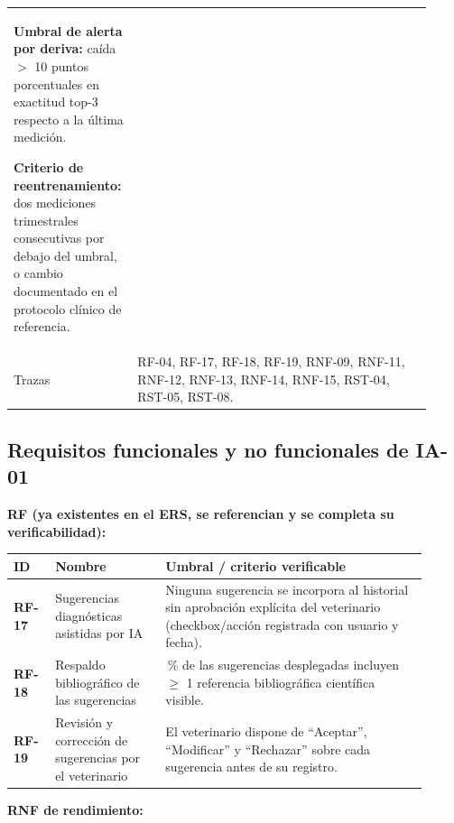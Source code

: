 \begin{longtable}{@{}>{\bfseries\raggedright\arraybackslash}p{0.24\linewidth} >{\raggedright\arraybackslash}p{0.68\linewidth}@{}}
\textbf{Umbral de alerta por deriva:} caída $>$ 10 puntos porcentuales en exactitud top-3 respecto a la última medición.

\textbf{Criterio de reentrenamiento:} dos mediciones trimestrales consecutivas por debajo del umbral, o cambio documentado en el protocolo clínico de referencia. \\[4pt]

Trazas & RF-04, RF-17, RF-18, RF-19, RNF-09, RNF-11, RNF-12, RNF-13, RNF-14, RNF-15, RST-04, RST-05, RST-08. \\

\end{longtable}

\subsection{Requisitos funcionales y no funcionales de IA-01}
\label{sec:rfrnf-ia01}

\textbf{RF (ya existentes en el ERS, se referencian y se completa su verificabilidad):}

\begin{longtable}{@{}>{\bfseries}p{0.09\linewidth} >{\raggedright\arraybackslash}p{0.24\linewidth} >{\raggedright\arraybackslash}p{0.58\linewidth}@{}}
\toprule
\textbf{ID} & \textbf{Nombre} & \textbf{Umbral / criterio verificable} \\
\midrule
\endhead
\bottomrule
\endlastfoot
RF-17 & Sugerencias diagnósticas asistidas por IA & Ninguna sugerencia se incorpora al historial sin aprobación explícita del veterinario (checkbox/acción registrada con usuario y fecha). \\
RF-18 & Respaldo bibliográfico de las sugerencias & 100\,\% de las sugerencias desplegadas incluyen $\geq$ 1 referencia bibliográfica científica visible. \\
RF-19 & Revisión y corrección de sugerencias por el veterinario & El veterinario dispone de ``Aceptar'', ``Modificar'' y ``Rechazar'' sobre cada sugerencia antes de su registro. \\
\end{longtable}

\textbf{RNF de rendimiento:}

